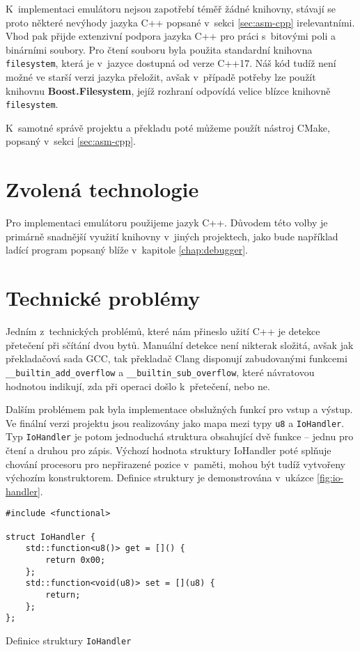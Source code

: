 K~implementaci emulátoru nejsou zapotřebí téměř žádné knihovny, stávají se proto některé nevýhody jazyka C++ popsané v~sekci \ref{sec:asm-cpp} irelevantními. Vhod pak přijde extenzivní podpora jazyka C++ pro práci s~bitovými poli a binárními soubory. Pro čtení souboru byla použita standardní knihovna \texttt{filesystem}, která je v~jazyce dostupná od verze C++17. Náš kód tudíž není možné ve starší verzi jazyka přeložit, avšak v~případě potřeby lze použít knihovnu \textbf{Boost.Filesystem}\cite{boost-filesystem}, jejíž rozhraní odpovídá velice blízce knihovně \texttt{filesystem}.

K~samotné správě projektu a překladu poté můžeme použít nástroj CMake, popsaný v~sekci \ref{sec:asm-cpp}.

\section{Zvolená technologie}

Pro implementaci emulátoru použijeme jazyk C++. Důvodem této volby je primárně snadnější využití knihovny v~jiných projektech, jako bude například ladící program popsaný blíže v~kapitole \ref{chap:debugger}.

\section{Technické problémy}

Jedním z~technických problémů, které nám přineslo užití C++ je detekce přetečení při sčítání dvou bytů. Manuální detekce není nikterak složitá, avšak jak překladačová sada GCC\cite{gcc-overflow}, tak překladač Clang\cite{clang-overflow} disponují zabudovanými funkcemi \texttt{\_\_builtin\_add\_overflow} a \texttt{\_\_builtin\_sub\_overflow}, které návratovou hodnotou indikují, zda při operaci došlo k~přetečení, nebo ne.

Dalším problémem pak byla implementace obslužných funkcí pro vstup a výstup. Ve finální verzi projektu jsou realizovány jako mapa mezi typy \texttt{u8} a \texttt{IoHandler}. Typ \texttt{IoHandler} je potom jednoduchá struktura obsahující dvě funkce -- jednu pro čtení a druhou pro zápis. Výchozí hodnota struktury IoHandler poté splňuje chování procesoru pro nepřirazené pozice v~paměti, mohou být tudíž vytvořeny výchozím konstruktorem. Definice struktury je demonstrována v~ukázce \ref{fig:io-handler}.

\begin{listing}[htbp]
\begin{verbatim}
#include <functional>

struct IoHandler {
    std::function<u8()> get = []() {
        return 0x00;
    };
    std::function<void(u8)> set = [](u8) {
        return;
    };
};
\end{verbatim}
\caption{Definice struktury \texttt{IoHandler}}
\label{fig:io-handler}
\end{listing}

